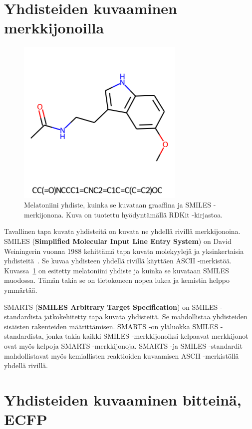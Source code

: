 \documentclass[finnish,twoside,censored,tkt,sw-line]{HYthesisML}
\begin{document}
\section{Yhdisteiden kuvaaminen merkkijonoilla}

\begin{figure}[!ht]
    \centering
    \includegraphics[width=8cm, height=8cm]{melatonin-smiles.png}
    \caption{Melatoniini yhdiste, kuinka se kuvataan graaffina ja SMILES -merkijonona.
        Kuva on tuotettu hyödyntämällä RDKit -kirjastoa.}
    \label{fig:melatonin}
\end{figure}

Tavallinen tapa kuvata yhdisteitä on kuvata ne yhdellä rivillä merkkijonoina.
SMILES (\textbf{Simplified Molecular Input Line Entry System}) on David Weiningerin vuonna 1988 kehittämä tapa kuvata molekyylejä ja yksinkertaisia yhdisteitä~\cite{WeiningerSMILES}.
Se kuvaa yhdisteen yhdellä rivillä käyttäen ASCII -merkistöä.
Kuvassa~\ref{fig:melatonin} on esitetty melatoniini yhdiste ja kuinka se kuvataan SMILES muodossa.
Tämän takia se on tietokoneen nopea lukea ja kemistin helppo ymmärtää.

SMARTS (\textbf{SMILES Arbitrary Target Specification}) on SMILES -standardista jatkokehitetty tapa kuvata yhdisteitä.
Se mahdollistaa yhdisteiden sisäisten rakenteiden määrittämisen.
SMARTS -on yläluokka SMILES -standardista, jonka takia kaikki SMILES -merkkijonoiksi kelpaavat merkkijonot ovat myös kelpoja SMARTS -merkkijonoja.
SMARTS -ja SMILES -standardit mahdollistavat myös kemiallisten reaktioiden kuvaamisen ASCII -merkistöllä yhdellä rivillä.

\section{Yhdisteiden kuvaaminen bitteinä, ECFP}
\end{document}
